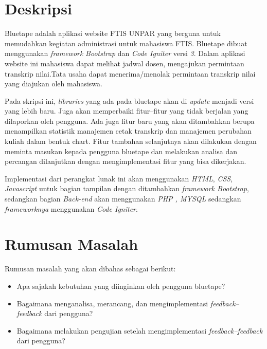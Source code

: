 \documentclass[a4paper,twoside]{article}
\begin{document}
\title{\@judultopik}
\author{\nama \textendash \@npm} 

\newcommand{\nama}{Stephen Hadi}
\newcommand{\@npm}{2017730016}
\newcommand{\@judultopik}{Analisa dan Implementasi Perbaikan Perangkat Lunak Bluetape} %
\newcommand{\jumpemb}{1} %
\newcommand{\tanggal}{05/10/2020}


\maketitle


\section{Deskripsi}
Bluetape adalah aplikasi website FTIS UNPAR yang berguna untuk memudahkan kegiatan administrasi untuk mahasiswa FTIS.
Bluetape dibuat menggunakan \textit{framework} \textit{Bootstrap} dan \textit{Code Igniter} versi \textit{3}. Dalam aplikasi website ini mahasiswa dapat melihat jadwal dosen, mengajukan permintaan transkrip nilai.Tata usaha dapat menerima/menolak permintaan transkrip nilai yang diajukan oleh mahasiswa.

Pada skripsi ini, \textit{libraries} yang ada pada bluetape akan di \textit{update} menjadi versi yang lebih baru. Juga akan memperbaiki fitur--fitur yang tidak berjalan yang dilaporkan oleh pengguna. Ada juga fitur baru yang akan ditambahkan berupa menampilkan statistik manajemen cetak transkrip dan manajemen perubahan kuliah dalam bentuk chart. Fitur tambahan selanjutnya akan dilakukan dengan meminta masukan kepada pengguna bluetape dan melakukan analisa dan percangan dilanjutkan dengan mengimplementasi fitur yang bisa dikerjakan.

Implementasi dari perangkat lunak ini akan menggunakan \textit{HTML}, \textit{CSS}, \textit{Javascript} untuk bagian tampilan dengan ditambahkan \textit{framework Bootstrap}, sedangkan bagian \textit{Back-end} akan menggunakan \textit{PHP , MYSQL} sedangkan \textit{frameworknya} menggunakan \textit{Code Igniter}.

\section{Rumusan Masalah}
Rumusan masalah yang akan dibahas sebagai berikut:
\begin{itemize}
	\item Apa sajakah kebutuhan yang diinginkan oleh pengguna bluetape?
	\item Bagaimana menganalisa, merancang, dan mengimplementasi \textit{feedback--feedback} dari pengguna?
	\item Bagaimana melakukan pengujian setelah mengimplementasi \textit{feedback--feedback} dari pengguna?

\end{itemize}
\end{document}
